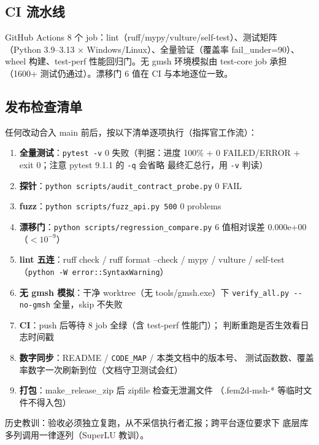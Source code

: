 \documentclass[12pt,a4paper]{ctexart}
\newcommand{\fem}{\Verb}
\begin{document}
\subsection{CI 流水线}

GitHub Actions 8 个 job：lint（ruff/mypy/vulture/self-test）、测试矩阵
（Python 3.9--3.13 × Windows/Linux）、全量验证（覆盖率 fail\_under=90）、
wheel 构建、test-perf 性能回归门。无 gmsh 环境模拟由 test-core job 承担
（1600+ 测试仍通过）。漂移门 6 值在 CI 与本地逐位一致。

\subsection{发布检查清单}

任何改动合入 main 前后，按以下清单逐项执行（指挥官工作流）：

\begin{enumerate}[leftmargin=*]
  \item \textbf{全量测试}：\fem|pytest -v| 0 失败（判据：进度 100\% +
        0 FAILED/ERROR + exit 0；注意 pytest 9.1.1 的 \texttt{-q} 会省略
        最终汇总行，用 \texttt{-v} 判读）
  \item \textbf{探针}：\fem|python scripts/audit_contract_probe.py| 0 FAIL
  \item \textbf{fuzz}：\fem|python scripts/fuzz_api.py 500| 0 problems
  \item \textbf{漂移门}：\fem|python scripts/regression_compare.py|
        6 值相对误差 0.000e+00（$<10^{-9}$）
  \item \textbf{lint 五连}：ruff check / ruff format --check / mypy /
        vulture / self-test（\texttt{python -W error::SyntaxWarning}）
  \item \textbf{无 gmsh 模拟}：干净 worktree（无 tools/gmsh.exe）下
        \fem|verify_all.py --no-gmsh| 全量，skip 不失败
  \item \textbf{CI}：push 后等待 8 job 全绿（含 test-perf 性能门）；
        判断重跑是否生效看日志时间戳
  \item \textbf{数字同步}：README / \texttt{CODE\_MAP} / 本类文档中的版本号、
        测试函数数、覆盖率数字一次刷新到位（文档守卫测试会红）
  \item \textbf{打包}：make\_release\_zip 后 zipfile 检查无泄漏文件
        （.fem2d-msh-* 等临时文件不得入包）
\end{enumerate}

历史教训：验收必须独立复跑，从不采信执行者汇报；跨平台逐位要求下
底层库多列调用一律逐列（SuperLU 教训）。
\end{document}
